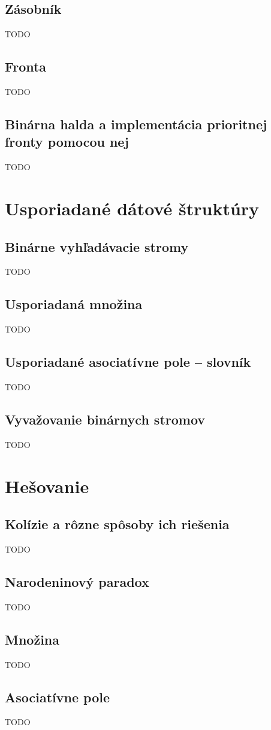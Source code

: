 	\subsection*{Zásobník} TODO
	\subsection*{Fronta} TODO
	\subsection*{Binárna halda a implementácia prioritnej fronty pomocou nej} TODO

\section{Usporiadané dátové štruktúry}
	\subsection*{Binárne vyhľadávacie stromy} TODO
	\subsection*{Usporiadaná množina} TODO
	\subsection*{Usporiadané asociatívne pole – slovník} TODO
	\subsection*{Vyvažovanie binárnych stromov} TODO

\section{Hešovanie}

	\subsection*{Kolízie a rôzne spôsoby ich riešenia} TODO
	\subsection*{Narodeninový paradox} TODO
	\subsection*{Množina} TODO
	\subsection*{Asociatívne pole} TODO

